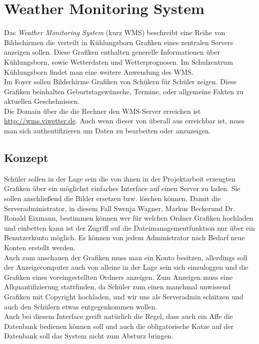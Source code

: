\documentclass[a4paper,oneside,12pt,titlepage]{article}
\newcommand{\mb}{Markus Becker}
\newcommand{\sw}{Swenja Wagner}
\newcommand{\re}{Dr. Ronald Eixmann}
\newcommand{\link}[1]{\textcolor{link}{\url{#1}}}	%
\begin{document}
\section{Weather Monitoring System}
Das \textit{Weather Monitoring System} (kurz WMS) beschreibt eine Reihe von Bildschirmen die verteilt in Kühlungsborn Grafiken eines zentralen Servers anzeigen sollen. Diese Grafiken enthalten generelle Informationen über Kühlungsborn, sowie Wetterdaten und Wetterprognosen. Im Schulzentrum Kühlungsborn findet man eine weitere Anwendung des WMS. \\
Im Foyer sollen Bildschirme Grafiken von Schülern für Schüler zeigen. Diese Grafiken beinhalten Geburtstagswünsche, Termine, oder allgemeine Fakten zu aktuellen Geschehnissen. \\
Die Domain über die die Rechner den WMS-Server erreichen ist \link{http://wms.viwetter.de}. Auch wenn dieser von überall aus erreichbar ist, muss man sich authentifizieren um Daten zu bearbeiten oder anzuzeigen.

\subsection{Konzept} %
Schüler sollen in der Lage sein die von ihnen in der Projektarbeit erzeugten Grafiken über ein möglichst einfaches Interface auf einen Server zu laden. Sie sollen anschließend die Bilder ersetzen bzw. löschen können. Damit die Serveradministrator, in diesem Fall \sw , \mb und \re , bestimmen können wer für welchen Ordner Grafiken hochladen und einbetten kann ist der Zugriff auf die Dateimanagementfunktion nur über ein Benutzerkonto möglich. Es können von jedem Administrator nach Bedarf neue Konten erstellt werden. \\
Auch zum anschauen der Grafiken muss man ein Konto besitzen, allerdings soll der Anzeigecomputer auch von alleine in der Lage sein sich einzuloggen und die Grafiken eines voreingestellten Ordners anzeigen. Zum Anzeigen muss eine Allquantifizierung stattfinden, da Schüler zum einen manchmal unwissend Grafiken mit Copyright hochladen, und wir uns als Serveradmin schützen und auch den Schülern etwas entgegenkommen wollen. \\
Auch bei diesem Interface greift natürlich die Regel, dass auch ein Affe die Datenbank bedienen können soll und auch die obligatorische Katze auf der Datenbank soll das System nicht zum Absturz bringen.
\end{document}
